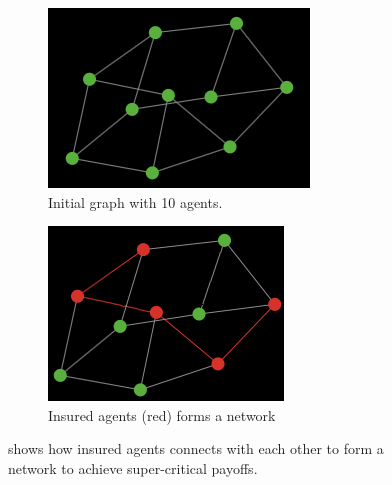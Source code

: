\begin{figure}[h]
\centering
\begin{subfigure}{.5\textwidth}
  \centering
  \includegraphics[width=0.8\linewidth]{../Figures/financialContagion1.png}
  \caption{\label{fig:fincont1} Initial graph with 10 agents.}
\end{subfigure}
\quad
\begin{subfigure}{.46\textwidth}
  \centering
  \includegraphics[width=0.8\linewidth]{../Figures/financialContagion2.png}
  \caption{\label{fig:fincont2} Insured agents (red) forms a network}
\end{subfigure}
\caption{\label{fig:fincont} shows how insured agents connects with each other to form a network to achieve super-critical payoffs.}
\end{figure}
